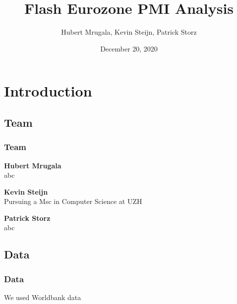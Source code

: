 \documentclass[10pt]{beamer}
\begin{document}
\title{Flash Eurozone PMI Analysis}
\author{Hubert Mrugala, Kevin Steijn, Patrick Storz}
\date{December 20, 2020} %

\begin{frame}
\titlepage
\end{frame}
\section{Introduction}
\begin{frame}
\subsection{Team}
\frametitle{Team}

\textbf{Hubert Mrugala} \\
abc

\vspace{3mm}

\textbf{Kevin Steijn} \\
Pursuing a Msc in Computer Science at UZH

\vspace{3mm}

\textbf{Patrick Storz} \\
abc
\end{frame}
\begin{frame}
\subsection{Data}
\frametitle{Data}

We used Worldbank data

\end{frame}
\end{document}

